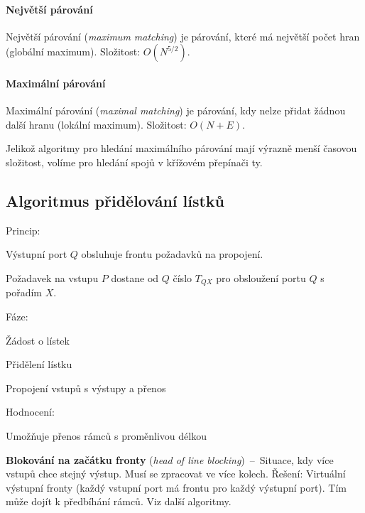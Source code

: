 \paragraph*{Největší párování} Největší párování (\textit{maximum matching}) je párování, které má největší počet hran (globální maximum). Složitost: $O(N^{5/2})$.

\paragraph*{Maximální párování} Maximální párování (\textit{maximal matching}) je párování, kdy nelze přidat žádnou další hranu (lokální maximum). Složitost: $O(N+E)$.

\bigskip\noindent Jelikož algoritmy pro hledání maximálního párování mají výrazně menší časovou složitost, volíme pro hledání spojů v křížovém přepínači ty.

\subsection{Algoritmus přidělování lístků}

\begin{compactitem}
    \item Princip: \begin{compactitem}
        \item Výstupní port $Q$ obsluhuje frontu požadavků na propojení.
        \item Požadavek na vstupu $P$ dostane od $Q$ číslo $T_{QX}$ pro obsloužení portu $Q$ s pořadím $X$.
    \end{compactitem}
    \item Fáze: \begin{compactenum}
        \item Žádost o lístek
        \item Přidělení lístku
        \item Propojení vstupů s výstupy a přenos
    \end{compactenum}
    \item Hodnocení: \begin{compactitem}
        \item Umožňuje přenos rámců s proměnlivou délkou
        \item \textbf{Blokování na začátku fronty} (\textit{head of line blocking})~--~Situace, kdy více vstupů chce stejný výstup. Musí se zpracovat ve více kolech. Řešení: Virtuální výstupní fronty (každý vstupní port má frontu pro každý výstupní port). Tím může dojít k předbíhání rámců. Viz další algoritmy.
    \end{compactitem}
\end{compactitem}

